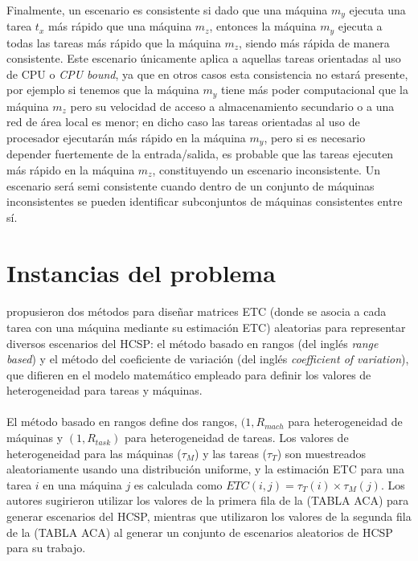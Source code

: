 \paragraph{}Finalmente, un escenario es consistente si dado que una máquina $m_y$ ejecuta una tarea $t_x$ más rápido que una máquina $m_z$, entonces la máquina $m_y$ ejecuta a todas las tareas más rápido que la máquina $m_z$, siendo más rápida de manera consistente. Este escenario únicamente aplica a aquellas tareas orientadas al uso de CPU o \textit{CPU bound}, ya que en otros casos esta consistencia no estará presente, por ejemplo si tenemos que la máquina $m_y$ tiene más poder computacional que la máquina $m_z$ pero su velocidad de acceso a almacenamiento secundario o a una red de área local es menor; en dicho caso las tareas orientadas al uso de procesador ejecutarán más rápido en la máquina $m_y$, pero si es necesario depender fuertemente de la entrada/salida, es probable que las tareas ejecuten más rápido en la máquina $m_z$, constituyendo un escenario inconsistente. Un escenario será semi consistente cuando dentro de un conjunto de máquinas inconsistentes se pueden identificar subconjuntos de máquinas consistentes entre sí.

\section{Instancias del problema} \label{section:descripcion-problema,subsection:instancias-del-problema}

\paragraph{}\citet{bib-ali-hc-etc} propusieron dos métodos para diseñar matrices ETC (donde se asocia a cada tarea con una máquina mediante su estimación ETC) aleatorias para representar diversos escenarios del HCSP: el método basado en rangos (del inglés \textit{range based}) y el método del coeficiente de variación (del inglés \textit{coefficient of variation}), que difieren en el modelo matemático empleado para definir los valores de heterogeneidad para tareas y máquinas.

\paragraph{}El método basado en rangos define dos rangos, $(1, R_{mach}$ para heterogeneidad de máquinas y $(1, R_{task})$ para heterogeneidad de tareas. Los valores de heterogeneidad para las máquinas ($\tau_{M}$) y las tareas ($\tau_{T}$) son muestreados aleatoriamente usando una distribución uniforme, y la estimación ETC para una tarea $i$ en una máquina $j$ es calculada como $ETC(i,j) = \tau_{T}(i) \times \tau_{M}(j)$. Los autores sugirieron utilizar los valores de la primera fila de la (TABLA ACA) para generar escenarios del HCSP, mientras que \citet{bib-braun} utilizaron los valores de la segunda fila de la (TABLA ACA) al generar un conjunto de escenarios aleatorios de HCSP para su trabajo.

